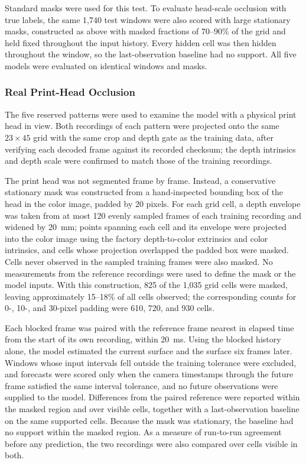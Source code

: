 Standard masks were used for this test. To evaluate head-scale occlusion with true labels, the same 1,740 test windows were also scored with large stationary masks, constructed as above with masked fractions of 70--90\% of the grid and held fixed throughout the input history. Every hidden cell was then hidden throughout the window, so the last-observation baseline had no support. All five models were evaluated on identical windows and masks.

\subsubsection{Real Print-Head Occlusion}
The five reserved patterns were used to examine the model with a physical print head in view. Both recordings of each pattern were projected onto the same $23 \times 45$ grid with the same crop and depth gate as the training data, after verifying each decoded frame against its recorded checksum; the depth intrinsics and depth scale were confirmed to match those of the training recordings.

The print head was not segmented frame by frame. Instead, a conservative stationary mask was constructed from a hand-inspected bounding box of the head in the color image, padded by 20 pixels. For each grid cell, a depth envelope was taken from at most 120 evenly sampled frames of each training recording and widened by 20~mm; points spanning each cell and its envelope were projected into the color image using the factory depth-to-color extrinsics and color intrinsics, and cells whose projection overlapped the padded box were masked. Cells never observed in the sampled training frames were also masked. No measurements from the reference recordings were used to define the mask or the model inputs. With this construction, 825 of the 1,035 grid cells were masked, leaving approximately 15--18\% of all cells observed; the corresponding counts for 0-, 10-, and 30-pixel padding were 610, 720, and 930 cells.

Each blocked frame was paired with the reference frame nearest in elapsed time from the start of its own recording, within 20~ms. Using the blocked history alone, the model estimated the current surface and the surface six frames later. Windows whose input intervals fell outside the training tolerance were excluded, and forecasts were scored only when the camera timestamps through the future frame satisfied the same interval tolerance, and no future observations were supplied to the model. Differences from the paired reference were reported within the masked region and over visible cells, together with a last-observation baseline on the same supported cells. Because the mask was stationary, the baseline had no support within the masked region. As a measure of run-to-run agreement before any prediction, the two recordings were also compared over cells visible in both.

